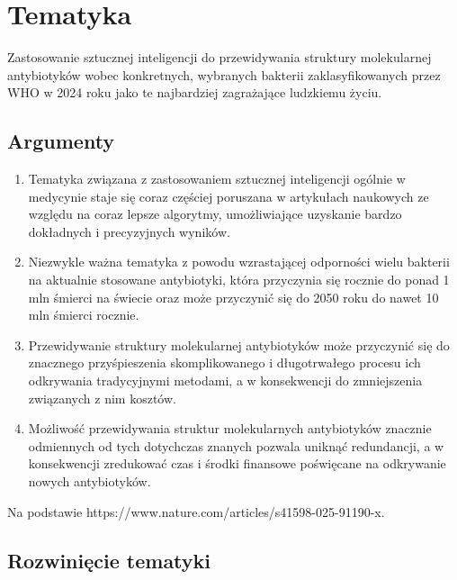 \section{Tematyka}

Zastosowanie sztucznej inteligencji do przewidywania struktury molekularnej antybiotyków wobec konkretnych, wybranych bakterii zaklasyfikowanych przez WHO w 2024 roku jako te najbardziej zagrażające ludzkiemu życiu.

\subsection{Argumenty}

\begin{enumerate}
    \item Tematyka związana z zastosowaniem sztucznej inteligencji ogólnie w medycynie staje się coraz częściej poruszana w artykułach naukowych ze względu na coraz lepsze algorytmy, umożliwiające uzyskanie bardzo dokładnych i precyzyjnych wyników.
    \item Niezwykle ważna tematyka z powodu wzrastającej odporności wielu bakterii na aktualnie stosowane antybiotyki, która przyczynia się rocznie do ponad 1 mln śmierci na świecie oraz może przyczynić się do 2050 roku do nawet 10 mln śmierci rocznie.
    \item Przewidywanie struktury molekularnej antybiotyków może przyczynić się do znacznego przyśpieszenia skomplikowanego i długotrwałego procesu ich odkrywania tradycyjnymi metodami, a w konsekwencji do zmniejszenia związanych z nim kosztów.
    \item Możliwość przewidywania struktur molekularnych antybiotyków znacznie odmiennych od tych dotychczas znanych pozwala uniknąć redundancji, a w konsekwencji zredukować czas i środki finansowe poświęcane na odkrywanie nowych antybiotyków.
\end{enumerate}

Na podstawie https://www.nature.com/articles/s41598-025-91190-x.

\subsection{Rozwinięcie tematyki}

